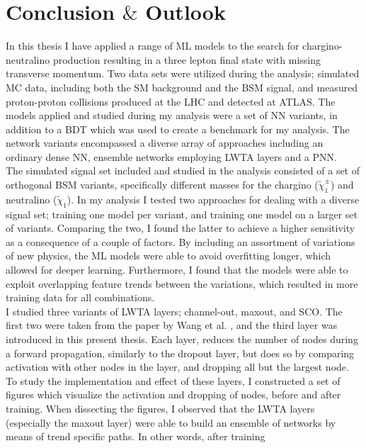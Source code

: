 \newpage
\chapter*{Conclusion $\&$ Outlook}
In this thesis I have applied a range of \ac{ML} models to the search for chargino-neutralino production resulting in 
a three lepton final state with missing transverse momentum. Two data sets were utilized during the analysis; simulated \ac{MC} data, including 
both the \ac{SM} background and the \ac{BSM} signal, and  measured proton-proton collisions produced at the \ac{LHC} and detected 
at \ac{ATLAS}. The models applied and studied during my analysis were a set of \ac{NN} variants, in addition to a \ac{BDT} which was used to 
create a benchmark for my analysis. The network variants encompassed a diverse array of approaches including an ordinary dense \ac{NN}, ensemble networks employing 
\ac{LWTA} layers and a \ac{PNN}.
\\
The simulated signal set included and studied in the analysis consisted of a set of orthogonal \ac{BSM} variants, specifically different masses for the chargino ($\tilde{\chi}^\pm_1$) 
and neutralino ($\tilde{\chi}_1$). In my analysis I tested two approaches for dealing with a diverse signal set; training one model per variant, and training one model on a larger set 
of variants. Comparing the two, I found the latter to achieve a higher sensitivity as a consequence of a couple of factors. By including an assortment of variations of new physics, 
the \ac{ML} models were able to avoid overfitting longer, which allowed for deeper learning. Furthermore, I found that the models were able to exploit overlapping feature trends between 
the variations, which resulted in more training data for all combinations.  
\\
I studied three variants of \ac{LWTA} layers; channel-out, maxout, and \ac{SCO}. The first two were taken from the paper by Wang et al. \cite{wang_maxout_2013}, and the third layer was introduced
in this present thesis. Each layer, reduces the number of nodes during a forward propagation, similarly to the dropout layer, but does so by comparing activation with other nodes in the layer, and 
dropping all but the largest node. To study the implementation and effect of these layers, I constructed a set of figures which visualize the activation and dropping of nodes, before and after training. 
When dissecting the figures, I observed that the \ac{LWTA} layers (especially the maxout layer) were able to build an ensemble of networks by means of trend specific paths. In other words, after training 
